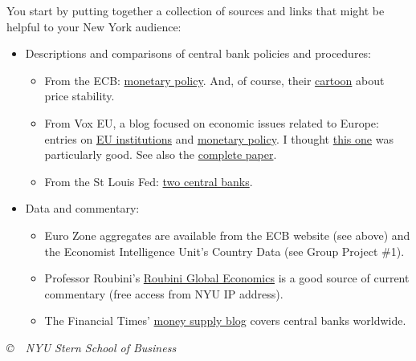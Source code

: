 \documentclass[letterpaper,12pt]{article}
\begin{document}
You start by putting together a collection of sources and 
links that might be helpful to your New York audience: 
%
\begin{itemize}

\item Descriptions and comparisons of central bank policies and procedures:
%
\begin{itemize}
\item From the ECB:  
\href{http://www.ecb.int/mopo/html/index.en.html}{monetary policy}. 
And, of course, their 
\href{http://www.ecb.int/ecb/educational/pricestab/html/index.en.html}
{cartoon} about price stability.  

\item From Vox EU, 
a blog focused on economic issues related to Europe:
entries on 
    \href{http://www.voxeu.org/index.php?q=node/30}{EU institutions} and 
\href{http://www.voxeu.org/index.php?q=node/32}{monetary policy}.  
I thought 
\href{http://www.voxeu.org/index.php?q=node/3010}{this one} 
was particularly good. 
See also the 
\href{http://www.ecb.int/pub/pdf/scpwps/ecbwp742.pdf}{complete paper}. 

\item From the St Louis Fed:  
\href{http://research.stlouisfed.org/publications/review/03/01/Pollard.pdf}
{two central banks}.   


\end{itemize}

\item Data and commentary:  
\begin{itemize}
\item Euro Zone aggregates are available from the ECB website 
(see above) and the Economist Intelligence Unit's 
Country Data (see Group Project \#1).    

\item Professor Roubini's 
\href{http://www.rgemonitor.com/}{Roubini Global Economics}
  is a good source of current commentary 
  (free access from NYU IP address).
  
\item The Financial Times' 
\href{http://blogs.ft.com/money-supply/}
{money supply blog} covers central banks worldwide.  

\end{itemize}

\end{itemize}


\vfill \centerline{\it \copyright \ \number\year \ 
NYU Stern School of Business}
\end{document}
